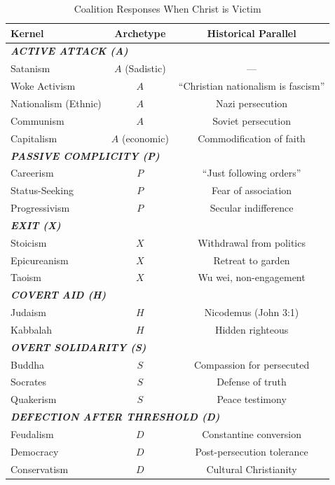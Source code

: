 \documentclass[11pt,a4paper]{article}
\theoremstyle{definition}
\theoremstyle{remark}
\begin{document}
\begin{table}[H]
\centering
\caption{Coalition Responses When Christ is Victim}
\label{tab:coalition-christ}
\begin{tabular}{@{}lcc@{}}
\toprule
\textbf{Kernel} & \textbf{Archetype} & \textbf{Historical Parallel} \\
\midrule
\multicolumn{3}{l}{\textit{\textbf{ACTIVE ATTACK (A)}}} \\
Satanism & $A$ (Sadistic) & --- \\
Woke Activism & $A$ & ``Christian nationalism is fascism'' \\
Nationalism (Ethnic) & $A$ & Nazi persecution \\
Communism & $A$ & Soviet persecution \\
Capitalism & $A$ (economic) & Commodification of faith \\
\midrule
\multicolumn{3}{l}{\textit{\textbf{PASSIVE COMPLICITY (P)}}} \\
Careerism & $P$ & ``Just following orders'' \\
Status-Seeking & $P$ & Fear of association \\
Progressivism & $P$ & Secular indifference \\
\midrule
\multicolumn{3}{l}{\textit{\textbf{EXIT (X)}}} \\
Stoicism & $X$ & Withdrawal from politics \\
Epicureanism & $X$ & Retreat to garden \\
Taoism & $X$ & Wu wei, non-engagement \\
\midrule
\multicolumn{3}{l}{\textit{\textbf{COVERT AID (H)}}} \\
Judaism & $H$ & Nicodemus (John 3:1) \\
Kabbalah & $H$ & Hidden righteous \\
\midrule
\multicolumn{3}{l}{\textit{\textbf{OVERT SOLIDARITY (S)}}} \\
Buddha & $S$ & Compassion for persecuted \\
Socrates & $S$ & Defense of truth \\
Quakerism & $S$ & Peace testimony \\
\midrule
\multicolumn{3}{l}{\textit{\textbf{DEFECTION AFTER THRESHOLD (D)}}} \\
Feudalism & $D$ & Constantine conversion \\
Democracy & $D$ & Post-persecution tolerance \\
Conservatism & $D$ & Cultural Christianity \\
\bottomrule
\end{tabular}
\end{table}
\end{document}

